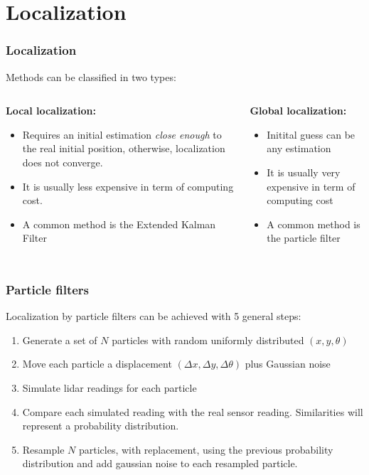 \section{Localization}
\begin{frame}\frametitle{Localization}
  Methods can be classified in two types:
\[\]
  \begin{columns}
    \begin{column}{0.5\textwidth}
      \textbf{Local localization: }
      \begin{itemize}
      \item Requires an initial estimation \textit{close enough} to the real initial position, otherwise, localization does not converge.
      \item It is usually less expensive in term of computing cost.
      \item A common method is the Extended Kalman Filter
      \end{itemize}
    \end{column}
    \begin{column}{0.5\textwidth}
      \textbf{Global localization:}
      \begin{itemize}
      \item Initital guess can be any estimation
      \item It is usually very expensive in term of computing cost
      \item A common method is the particle filter
      \end{itemize}
      \[\]
      \[\]
    \end{column}
  \end{columns}
\end{frame}

\begin{frame}\frametitle{Particle filters}
  Localization by particle filters can be achieved with 5 general steps:
  \begin{enumerate}
  \item Generate a set of $N$ particles with random uniformly distributed $(x,y,\theta)$
  \item Move each particle a displacement  $(\Delta x, \Delta y, \Delta\theta)$ plus Gaussian noise
  \item Simulate lidar readings for each particle
  \item Compare each simulated reading with the real sensor reading. Similarities will represent a probability distribution.
  \item Resample $N$ particles, with replacement, using the previous probability distribution and add gaussian noise to each resampled particle. 
  \end{enumerate}
\end{frame}

